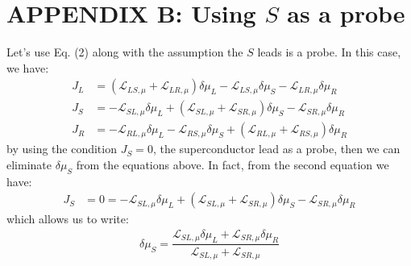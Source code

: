 \section{APPENDIX B: Using $S$ as a probe}

Let's use Eq. (2) along with the assumption the $S$ leads is a probe. In this case, we have:
\begin{align}\label{JL}
J_{L}&=
(\mathcal{L}_{LS,\mu}+\mathcal{L}_{LR,\mu} )\delta\mu_{L}
-\mathcal{L}_{LS,\mu}\delta\mu_{S}
-\mathcal{L}_{LR,\mu}\delta\mu_{R}
\\\label{JS}
J_{S}&=
-\mathcal{L}_{SL,\mu}\delta\mu_{L}
+
(\mathcal{L}_{SL,\mu}+\mathcal{L}_{SR,\mu})\delta\mu_{S}
-
\mathcal{L}_{SR,\mu}\delta\mu_{R}
\\\label{JR}
J_{R}&= 
-\mathcal{L}_{RL,\mu}\delta\mu_{L} 
-\mathcal{L}_{RS,\mu}\delta\mu_{S}
+
(\mathcal{L}_{RL,\mu}+\mathcal{L}_{RS,\mu})\delta\mu_{R}
\end{align}
by using the condition $J_{S}=0$, the superconductor lead as a probe, then we can eliminate $\delta\mu_{S}$ from the equations above. In fact, from the second equation we have:
\begin{align*}
J_{S}&=0=
-\mathcal{L}_{SL,\mu}\delta\mu_{L}
+
(\mathcal{L}_{SL,\mu}+\mathcal{L}_{SR,\mu})\delta\mu_{S}
-
\mathcal{L}_{SR,\mu}\delta\mu_{R}
\end{align*}
which allows us to write:
\begin{align}\label{delta:muS}
\delta\mu_{S}
=
\dfrac{\mathcal{L}_{SL,\mu}\delta\mu_{L}+\mathcal{L}_{SR,\mu}\delta\mu_{R}}{\mathcal{L}_{SL,\mu}+\mathcal{L}_{SR,\mu}}
\end{align}
